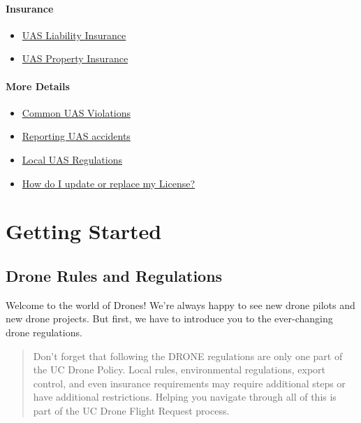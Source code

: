 \documentclass[
]{book}
\providecommand{\tightlist}{%
  \setlength{\itemsep}{0pt}\setlength{\parskip}{0pt}}
\begin{document}
\hypertarget{insurance}{%
\subsection*{Insurance}\label{insurance}}

\begin{itemize}
\tightlist
\item
  \protect\hyperlink{ch-liability-insurance}{UAS Liability Insurance}
\item
  \protect\hyperlink{ch-hull-insurance}{UAS Property Insurance}
\end{itemize}

\hypertarget{more-details}{%
\subsection*{More Details}\label{more-details}}

\begin{itemize}
\tightlist
\item
  \protect\hyperlink{ch-common-UAS-violations}{Common UAS Violations}
\item
  \protect\hyperlink{ch-uas-accident}{Reporting UAS accidents}
\item
  \protect\hyperlink{ch-local-UAS-regulations}{Local UAS Regulations}
\item
  \protect\hyperlink{ch-replace-license}{How do I update or replace my License?}
\end{itemize}

\hypertarget{part-getting-started}{%
\part{Getting Started}\label{part-getting-started}}

\hypertarget{ch-regulations}{%
\chapter{Drone Rules and Regulations}\label{ch-regulations}}

Welcome to the world of Drones! We're always happy to see new drone pilots and new drone projects. But first, we have to introduce you to the ever-changing drone regulations.

\begin{quote}
Don't forget that following the DRONE regulations are only one part of the UC Drone Policy. Local rules, environmental regulations, export control, and even insurance requirements may require additional steps or have additional restrictions. Helping you navigate through all of this is part of the UC Drone Flight Request process.
\end{quote}
\end{document}

